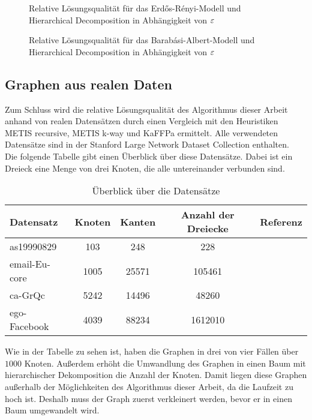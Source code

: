 \begin{figure}[H]
    \centering
    
    \caption{Relative Lösungsqualität für das Erdős-Rényi-Modell und Hierarchical Decomposition in Abhängigkeit von $\varepsilon$\label{fig:edgeprobhdecompimb}}
\end{figure}

\begin{figure}[H]
    \centering
    
    \caption{Relative Lösungsqualität für das Barabási-Albert-Modell und Hierarchical Decomposition in Abhängigkeit von $\varepsilon$\label{fig:prefattachhdecompimb}}
\end{figure}

\subsection{Graphen aus realen Daten}
Zum Schluss wird die relative Lösungsqualität des Algorithmus dieser Arbeit anhand von realen Datensätzen durch einen Vergleich mit den Heuristiken METIS recursive, METIS k-way und KaFFPa ermittelt.
Alle verwendeten Datensätze sind in der Stanford Large Network Dataset Collection enthalten.~\cite{LK14}
Die folgende Tabelle gibt einen Überblick über diese Datensätze.
Dabei ist ein Dreieck eine Menge von drei Knoten, die alle untereinander verbunden sind.

\begin{table}[H]
    \centering
    \begin{tabular}{lcccc}
        \toprule
        Datensatz & Knoten & Kanten & Anzahl der Dreiecke & Referenz \\
        \midrule
        as19990829 & 103 & 248 & 228 & \cite{LKF05} \\
        email-Eu-core & 1005 & 25571 & 105461 & \cite{LKF07} \\
        ca-GrQc & 5242 & 14496 & 48260 & \cite{LKF07} \\
        ego-Facebook & 4039 & 88234 & 1612010 & \cite{ML14} \\
        \bottomrule
    \end{tabular}
    \caption{Überblick über die Datensätze}
\end{table}

Wie in der Tabelle zu sehen ist, haben die Graphen in drei von vier Fällen über $1000$ Knoten.
Außerdem erhöht die Umwandlung des Graphen in einen Baum mit hierarchischer Dekomposition die Anzahl der Knoten. 
Damit liegen diese Graphen außerhalb der Möglichkeiten des Algorithmus dieser Arbeit, da die Laufzeit zu hoch ist.
Deshalb muss der Graph zuerst verkleinert werden, bevor er in einen Baum umgewandelt wird.

